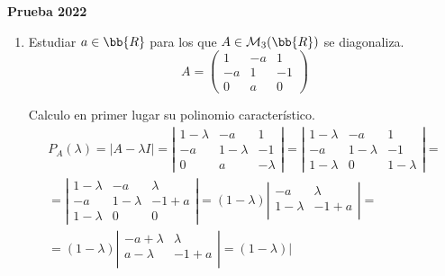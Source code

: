 \begin{ejercicio}\textbf{Prueba 2022}
\begin{enumerate}
    \item Estudiar $a\in\bb{R}$ para los que $A\in\mathcal{M}_3(\bb{R})$ se diagonaliza.
    \begin{equation*}
        A = \left( \begin{array}{ccc}
            1 & -a & 1 \\
            -a & 1 & -1 \\
            0 & a & 0
        \end{array} \right)
    \end{equation*}

    Calculo en primer lugar su polinomio característico.
    \begin{multline*}
        P_A(\lambda) = |A-\lambda I| = \left| \begin{array}{ccc}
            1-\lambda & -a & 1 \\
            -a & 1-\lambda & -1 \\
            0 & a & -\lambda
        \end{array} \right|
        = \left| \begin{array}{ccc}
            1-\lambda & -a & 1 \\
            -a & 1-\lambda & -1 \\
            1-\lambda & 0 & 1-\lambda
        \end{array} \right| = \\
        = \left| \begin{array}{ccc}
            1-\lambda & -a & \lambda \\
            -a & 1-\lambda & -1+a \\
            1-\lambda & 0 & 0
        \end{array} \right| 
        = (1-\lambda)\left| \begin{array}{cc}
            -a & \lambda \\
            1-\lambda & -1+a \\
        \end{array} \right| = \\
        = (1-\lambda)\left| \begin{array}{cc}
            -a+\lambda & \lambda \\
            a-\lambda & -1+a \\
        \end{array} \right|
        = (1-\lambda)\left| \begin{array}{cc}

\end{array}
\end{multline*}
\end{enumerate}
\end{ejercicio}
